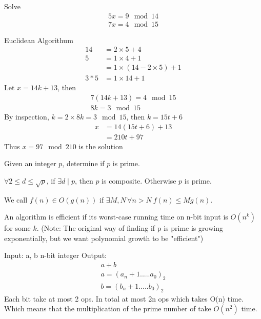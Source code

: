 
\begin{exmp}
Solve \begin{gather*}
    5x = 9\mod 14\\
    7x = 4 \mod 15
\end{gather*}
\end{exmp}

\begin{solution}
Euclidean Algorithum
\begin{align*}
14  &= 2 \times 5 +4\\
5 &= 1\times 4 +1\\
&= 1\times (14-2\times 5) +1 \\
3*5 &= 1\times 14 +1
\end{align*}
Let $x = 14k +13$, then
\begin{align*}
7(14k+13) = 4 \mod 15\\
8k = 3 \mod 15 
\end{align*}
By inspection, $ k = 2 \times 8k = 3 \mod 15 $, then $ k = 15t +6$
\begin{align*}
x&=14(15t+6)+13\\
&=210t+97
\end{align*}
Thus $x = 97 \mod 210$ is the solution    
\end{solution}


 Given an integer $p$, determine if $p$ is prime.

\begin{exmp}
$\forall 2\leq d \leq \sqrt{p}$, if $\exists d \mid p$, then $p$ is composite. Otherwise $p$ is prime.
\end{exmp}

\begin{defn}
We call $f(n)\in O(g(n))$ if $\exists M,N \, \forall n> N \ f(n) \leq Mg(n)$.
\end{defn}

\begin{defn}[Efficient]
An algorithm is efficient if its worst-case running time on n-bit input is $O(n^k)$ for some $k$.
(Note: The original way of finding if p is prime is growing exponentially, but we want polynomial growth to be "efficient")
\end{defn}


\begin{exmp}
    Input: a, b n-bit integer
    Output: 
    \begin{align*}
    a+b\\
    a=(a_n+1 ..... a_0)_2\\
    b=(b_n+1 ..... b_0)_2
    \end{align*}
    Each bit take at most 2 ops. In total at most 2n ops which takes O(n) time. Which means that the multiplication of the prime number of take $O(n^2)$ time.
\end{exmp}

